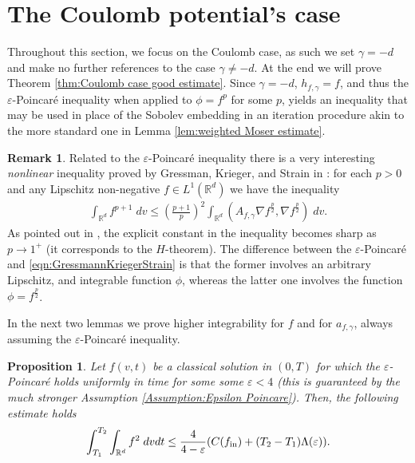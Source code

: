 \documentclass[12pt,american]{amsart}
\numberwithin{equation}{section}
\theoremstyle{plain}
\newtheorem{prop}[thm]{Proposition}
\theoremstyle{definition}                  %
\newtheorem{rem}[thm]{Remark}
\def\fin{f_{\textnormal{in}}}
\def\Lamp{\Lambda(\varepsilon)}
\begin{document}
\section{The Coulomb potential's case}\label{section:Coulomb regularization}

Throughout this section, we focus on the Coulomb case, as such we set $\gamma=-d$ and make no further references to the case $\gamma\neq-d$. At the end we will prove Theorem \ref{thm:Coulomb case good estimate}.  Since $\gamma=-d$, $h_{f,\gamma} = f$, and thus the $\varepsilon$-Poincar\'e inequality when applied to $\phi = f^p$ for some $p$, yields an inequality that may be used in place of the Sobolev embedding in an iteration procedure akin to the more standard one in Lemma \ref{lem:weighted Moser estimate}. 

\begin{rem} Related to the $\varepsilon$-Poincar\'e inequality there is a very interesting \emph{nonlinear} inequality proved by Gressman, Krieger, and Strain in  \cite{GreKriStr2012}: for each $p>0$ and any Lipschitz non-negative $f \in L^1(\mathbb{R}^d)$ we have the inequality 
\begin{align}\label{eqn:GressmannKriegerStrain}
  \int_{\mathbb{R}^d} f^{p+1}\;dv \leq \left (\frac{p+1}{p} \right )^2\int_{\mathbb{R}^d} (A_{f,\gamma}\nabla f^{\frac{p}{2}},\nabla f^{\frac{p}{2}})\;dv. 
\end{align}
As pointed out in \cite{GreKriStr2012}, the explicit constant in the inequality becomes sharp as $p\to 1^+$ (it corresponds to the $H$-theorem). The difference between the $\varepsilon$-Poincar\'e  and \eqref{eqn:GressmannKriegerStrain} is that the former involves an arbitrary Lipschitz, and integrable function $\phi$, whereas the latter one involves the function $\phi = f^{\frac{p}{2}}$. 
\end{rem}
In the next two lemmas we prove higher integrability for $f$ and for $a_{f,\gamma}$, always assuming the $\varepsilon$-Poincar\'e inequality.


\begin{prop}\label{prop:L2L2 bound for Coulomb case}
  Let $f(v,t)$ be a classical solution in $(0,T)$ for which the $\varepsilon$-Poincar\'e holds uniformly in time for some some $\varepsilon<4$ (this is guaranteed by the much stronger Assumption \ref{Assumption:Epsilon Poincare}). Then, the following estimate holds
  \begin{align*}
    \int_{T_1}^{T_2}\int_{\mathbb{R}^d}f^2\;dvdt \leq \frac{4}{4-\varepsilon}(C(\fin)+(T_2-T_1)\Lamp).
  \end{align*}
\end{prop}
\end{document}
